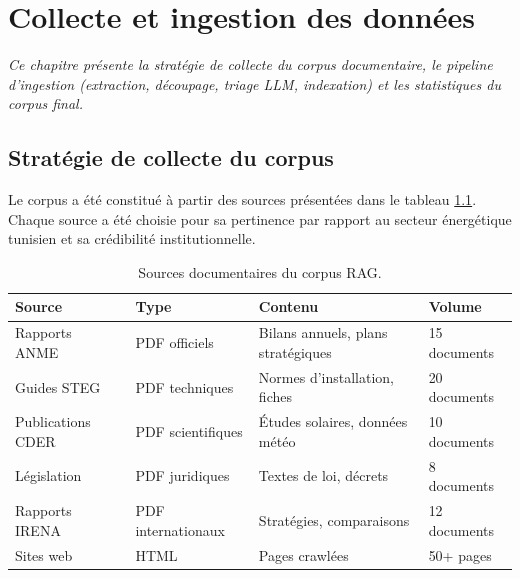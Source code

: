 \documentclass[12pt,a4paper,oneside]{report}
\newcommand{\chaptercolor}{mainblue}
\newcommand{\setchaptercolor}[1]{\renewcommand{\chaptercolor}{#1}}
\newcommand{\chapterabstract}[1]{\vspace{-0.5cm}\begin{center}\begin{minipage}{0.9\textwidth}\small\itshape\textcolor{\chaptercolor!70!black}{#1}\end{minipage}\end{center}\vspace{0.5cm}}
\begin{document}


\setchaptercolor{teal}

\chapter{Collecte et ingestion des donn\'{e}es}

\chapterabstract{Ce chapitre pr\'{e}sente la strat\'{e}gie de collecte du corpus documentaire, le pipeline d'ingestion (extraction, d\'{e}coupage, triage LLM, indexation) et les statistiques du corpus final.}



\section{Strat\'{e}gie de collecte du corpus}



Le corpus a \'{e}t\'{e} constitu\'{e} \`{a} partir des sources pr\'{e}sent\'{e}es dans le tableau \ref{tab:sources}. Chaque source a \'{e}t\'{e} choisie pour sa pertinence par rapport au secteur \'{e}nerg\'{e}tique tunisien et sa cr\'{e}dibilit\'{e} institutionnelle.



\begin{table}[htbp]\centering

\begin{tabular}{@{}p{4cm}p{3.5cm}p{3cm}p{2.5cm}@{}}

\toprule

\textbf{Source} & \textbf{Type} & \textbf{Contenu} & \textbf{Volume} \\

\midrule

Rapports ANME~\cite{anme2024} & PDF officiels & Bilans annuels, plans strat\'{e}giques & 15 documents \\

Guides STEG~\cite{steg2024} & PDF techniques & Normes d'installation, fiches & 20 documents \\

Publications CDER~\cite{cder} & PDF scientifiques & \'{E}tudes solaires, donn\'{e}es m\'{e}t\'{e}o & 10 documents \\

L\'{e}gislation & PDF juridiques & Textes de loi, d\'{e}crets & 8 documents \\

Rapports IRENA & PDF internationaux & Strat\'{e}gies, comparaisons & 12 documents \\

Sites web & HTML & Pages crawl\'{e}es & 50+ pages \\

\bottomrule

\end{tabular}

\caption{Sources documentaires du corpus RAG.}\label{tab:sources}

\end{table}
\end{document}
